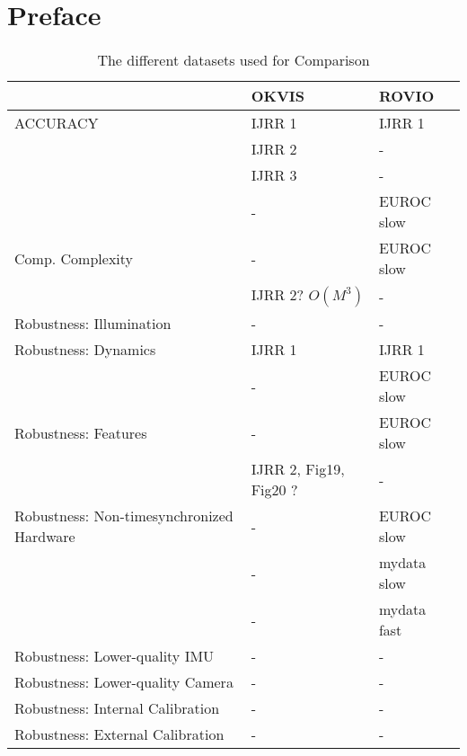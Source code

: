 \chapter*{Preface}

\begin{table}[ht]
\centering
\begin{tabular}{|p{7.0cm}|p{2.5cm}|p{2.5cm}|}
\hline
 & OKVIS & ROVIO \\
\hline\hline
ACCURACY & IJRR 1 & IJRR 1 \\
 & IJRR 2 & - \\
 & IJRR 3 & - \\
 & - & EUROC slow \\
\hline\hline
Comp. Complexity & - & EUROC slow \\
& IJRR 2? $O(M^3)$ & - \\
\hline\hline
Robustness: Illumination & - & - \\
\hline
Robustness: Dynamics & IJRR 1 & IJRR 1 \\
 & - & EUROC slow \\
\hline
Robustness: Features & - & EUROC slow \\
 & IJRR 2, Fig19, Fig20 ? & - \\
\hline
Robustness: Non-timesynchronized Hardware & - & EUROC slow \\
 & - & mydata slow \\
 & - & mydata fast \\
\hline
Robustness: Lower-quality IMU & - & - \\
\hline
Robustness: Lower-quality Camera & - & - \\
\hline
Robustness: Internal Calibration & - & - \\
\hline
Robustness: External Calibration & - & - \\
\hline

\end{tabular}
\caption{The different datasets used for Comparison}
\label{table:comparison}
\end{table}

